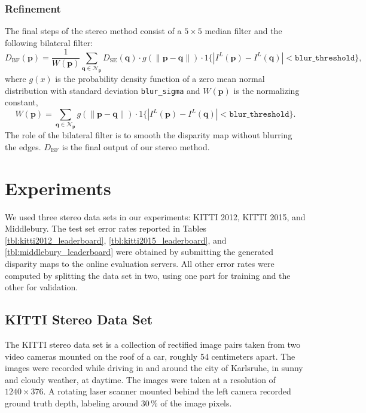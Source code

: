 \documentclass[twoside,11pt]{article}
\begin{document}
\subsubsection{Refinement}

The final steps of the stereo method consist of a $5 \times 5$ median filter and the
following bilateral filter:
%
\begin{equation*} 
D_{\text{BF}}(\mathbf{p}) = \frac{1}{W(\mathbf{p})}
\sum_{\mathbf{q} \in \mathcal{N}_\mathbf{p}} D_{\text{SE}}(\mathbf{q}) \cdot
g(\|\mathbf{p} - \mathbf{q}\|) \cdot 1\{|I^L(\mathbf{p}) - I^L(\mathbf{q})|
< \texttt{blur\_threshold}\},
\end{equation*}
%
where $g(x)$ is the probability density function of a zero mean normal
distribution with standard deviation \texttt{blur\_sigma} and $W(\mathbf{p})$ is the
normalizing constant,
%
\begin{equation*}
W(\mathbf{p}) = \sum_{\mathbf{q} \in \mathcal{N}_\mathbf{p}} g(\|\mathbf{p} -
\mathbf{q}\|) \cdot 1\{|I^L(\mathbf{p}) - I^L(\mathbf{q})| <
\texttt{blur\_threshold}\}.
\end{equation*}
%
The role of the bilateral filter is to smooth the disparity map without
blurring the edges. $D_{\text{BF}}$ is the final output of our stereo method.

\section{Experiments}

We used three stereo data sets in our experiments: KITTI 2012, KITTI 2015, and
Middle\-bury.  The test set error rates reported in Tables
\ref{tbl:kitti2012_leaderboard}, \ref{tbl:kitti2015_leaderboard}, and
\ref{tbl:middlebury_leaderboard} were obtained by submitting the generated
disparity maps to the online evaluation servers.  All other error rates were
computed by splitting the data set in two, using one part for training and the
other for validation.

\subsection{KITTI Stereo Data Set}

The KITTI stereo data set \citep{Geiger2013IJRR,menze2015object} is a collection
of rectified image pairs taken from two video cameras mounted on the roof of
a car, roughly 54 centimeters apart. The images were recorded while driving in
and around the city of Karlsruhe, in sunny and cloudy weather, at daytime. The
images were taken at a resolution of $1240 \times 376$. A rotating laser
scanner mounted behind the left camera recorded ground truth depth, labeling
around 30\,\% of the image pixels. 
\end{document}
